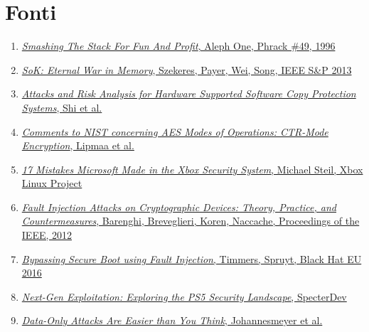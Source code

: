 \section{Fonti}
\begin{enumerate}
    \item\label{fonte:aleph_one} \href{http://www.phrack.org/issues/49/14.html}{\textit{Smashing The Stack For Fun And Profit}, Aleph One, Phrack \#49, 1996}
    \item\label{fonte:sok_memory} \href{https://people.eecs.berkeley.edu/~dawnsong/papers/Oakland13-SoK-CR.pdf}{\textit{SoK: Eternal War in Memory}, Szekeres, Payer, Wei, Song, IEEE S\&P 2013}
    \item\label{fonte:copy_protection} \href{http://profs.sci.univr.it/~giaco/download/Watermarking-Obfuscation/HW-tamper.pdf}{\textit{Attacks and Risk Analysis for Hardware Supported Software Copy Protection Systems}, Shi et al.}
    \item\label{fonte:ctr} \href{https://csrc.nist.rip/groups/ST/toolkit/BCM/documents/proposedmodes/ctr/ctr-spec.pdf}{\textit{Comments to NIST concerning AES Modes of Operations: CTR-Mode Encryption}, Lipmaa et al.}
    \item\label{fonte:xbox} \href{https://archive.org/details/17-security-mistakes-microsoft-xbox/mode/2up}{\textit{17 Mistakes Microsoft Made in the Xbox Security System}, Michael Steil, Xbox Linux Project}
    \item\label{fonte:barenghi} \href{https://ieeexplore.ieee.org/document/6178001}{\textit{Fault Injection Attacks on Cryptographic Devices: Theory, Practice, and Countermeasures}, Barenghi, Breveglieri, Koren, Naccache, Proceedings of the IEEE, 2012}
    \item\label{fonte:timmers} \href{https://www.blackhat.com/docs/eu-16/materials/eu-16-Timmers-Bypassing-Secure-Boot-Using-Fault-Injection.pdf}{\textit{Bypassing Secure Boot using Fault Injection}, Timmers, Spruyt, Black Hat EU 2016}
    \item\label{fonte:ps5} \href{https://hardwear.io/wp-content/uploads/2026/04/next-gen-exploitation-exploring-the-PS5-security-landscape.pdf}{\textit{Next-Gen Exploitation: Exploring the PS5 Security Landscape}, SpecterDev}
    \item\label{fonte:dataonly} \href{https://www.usenix.org/publications/loginonline/data-only-attacks-are-easier-you-think}{\textit{Data-Only Attacks Are Easier than You Think}, Johannesmeyer et al.}
\end{enumerate}
